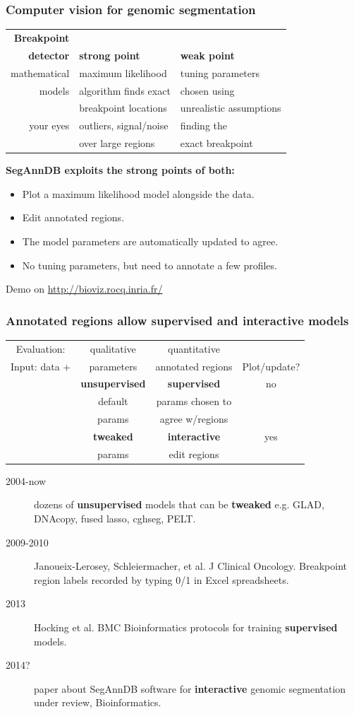 \documentclass{beamer}
\begin{document}
\begin{frame}
  \frametitle{Computer vision for genomic segmentation}
  \begin{tabular}{rll}
    \textbf{Breakpoint}\\
 \textbf{detector} & \textbf{strong point} & \textbf{weak point} \\
    \hline
    mathematical  & maximum likelihood & tuning parameters \\
    models & algorithm finds exact  & chosen using\\
& breakpoint locations  & unrealistic assumptions\\
    \hline
    your eyes & outliers, signal/noise & finding the \\
    & over large regions &  exact breakpoint
  \end{tabular}
\vskip 1cm
\textbf{SegAnnDB exploits the strong points of both:}
\begin{itemize}
\item Plot a maximum likelihood model alongside the data.
\item Edit annotated regions.
\item The model parameters are automatically updated to agree.
\item No tuning parameters, but need to annotate a few profiles.
\end{itemize}
Demo on \url{http://bioviz.rocq.inria.fr/}
\end{frame}

\begin{frame}
  \frametitle{Annotated regions allow supervised and interactive models}
  \begin{tabular}{c|c|c|c}
    Evaluation: & qualitative & quantitative \\
    Input: data + & parameters & annotated regions & Plot/update?\\
    \hline
    & \textbf{unsupervised} & \textbf{supervised} & no\\
    & default & params chosen to \\
    & params & agree w/regions\\
    \hline
    & \textbf{tweaked} & \textbf{interactive} & yes\\
    & params & edit regions
  \end{tabular}
  \begin{description}
  \item[2004-now] dozens of \textbf{unsupervised} models that can be
    \textbf{tweaked} e.g. GLAD, DNAcopy, fused lasso, cghseg, PELT.
  \item[2009-2010] Janoueix-Lerosey, Schleiermacher, et al. J Clinical
    Oncology. Breakpoint region labels recorded by typing 0/1 in Excel
    spreadsheets.
  \item[2013] Hocking et al. BMC Bioinformatics protocols for training
    \textbf{supervised} models.
  \item[2014?] paper about SegAnnDB software for \textbf{interactive}
    genomic segmentation under review, Bioinformatics.
  \end{description}
\end{frame}
\end{document}
